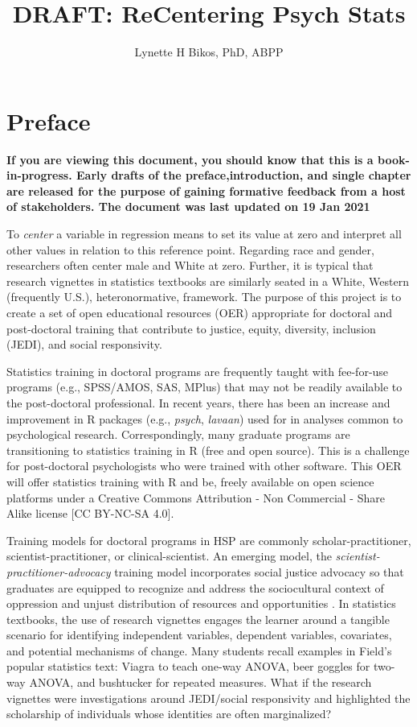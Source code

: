 \documentclass[
  english,
]{book}
\title{DRAFT: ReCentering Psych Stats}
\author{Lynette H Bikos, PhD, ABPP}
\date{}
\begin{document}
\maketitle

{
\setcounter{tocdepth}{1}
\tableofcontents
}
\hypertarget{preface}{%
\chapter*{Preface}\label{preface}}

\textbf{If you are viewing this document, you should know that this is a book-in-progress. Early drafts of the preface,introduction, and single chapter are released for the purpose of gaining formative feedback from a host of stakeholders. The document was last updated on 19 Jan 2021}

To \emph{center} a variable in regression means to set its value at zero and interpret all other values in relation to this reference point. Regarding race and gender, researchers often center male and White at zero. Further, it is typical that research vignettes in statistics textbooks are similarly seated in a White, Western (frequently U.S.), heteronormative, framework. The purpose of this project is to create a set of open educational resources (OER) appropriate for doctoral and post-doctoral training that contribute to justice, equity, diversity, inclusion (JEDI), and social responsivity.

Statistics training in doctoral programs are frequently taught with fee-for-use programs (e.g., SPSS/AMOS, SAS, MPlus) that may not be readily available to the post-doctoral professional. In recent years, there has been an increase and improvement in R packages (e.g., \emph{psych}, \emph{lavaan}) used for in analyses common to psychological research. Correspondingly, many graduate programs are transitioning to statistics training in R (free and open source). This is a challenge for post-doctoral psychologists who were trained with other software. This OER will offer statistics training with R and be, freely available on open science platforms under a Creative Commons Attribution - Non Commercial - Share Alike license {[}CC BY-NC-SA 4.0{]}.

Training models for doctoral programs in HSP are commonly scholar-practitioner, scientist-practitioner, or clinical-scientist. An emerging model, the \emph{scientist-practitioner-advocacy} training model incorporates social justice advocacy so that graduates are equipped to recognize and address the sociocultural context of oppression and unjust distribution of resources and opportunities \citep{mallinckrodt_scientist-practitioner-advocate_2014}. In statistics textbooks, the use of research vignettes engages the learner around a tangible scenario for identifying independent variables, dependent variables, covariates, and potential mechanisms of change. Many students recall examples in Field's \citeyearpar{field_discovering_2012} popular statistics text: Viagra to teach one-way ANOVA, beer goggles for two-way ANOVA, and bushtucker for repeated measures. What if the research vignettes were investigations around JEDI/social responsivity and highlighted the scholarship of individuals whose identities are often marginalized?
\end{document}
